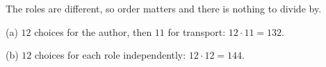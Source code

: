 The roles are different, so order matters and there is nothing to divide by.

(a) $12$ choices for the author, then $11$ for transport: $12\cdot11=\boxed{132}$.

(b) $12$ choices for each role independently: $12\cdot12=\boxed{144}$.
